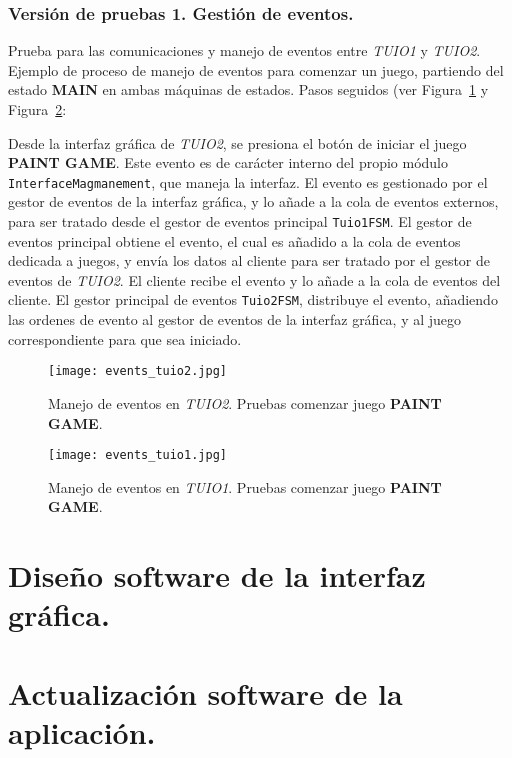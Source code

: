 \subsubsection{Versión de pruebas 1. Gestión de eventos.}

Prueba para las comunicaciones y manejo de eventos entre \emph{TUIO1} y \emph{TUIO2}. 
Ejemplo de proceso de manejo de eventos para comenzar un juego, partiendo del estado \textbf{MAIN} en ambas máquinas de estados. Pasos seguidos (ver Figura~\ref{fig:eventosTUIO2} y Figura~\ref{fig:eventosTUIO1}:

Desde la interfaz gráfica de \emph{TUIO2}, se presiona el botón de iniciar el juego \textbf{PAINT GAME}. Este evento es de carácter interno del propio módulo \texttt{InterfaceMagmanement}, que maneja la interfaz.
El evento es gestionado por el gestor de eventos de la interfaz gráfica, y lo añade a la cola de eventos externos, para ser tratado desde el gestor de eventos principal \texttt{Tuio1FSM}. 
El gestor de eventos principal obtiene el evento, el cual es añadido a la cola de eventos dedicada a juegos, y envía los datos al cliente para ser tratado por el gestor de eventos de \emph{TUIO2}.
El cliente recibe el evento y lo añade a la cola de eventos del cliente. El gestor principal de eventos \texttt{Tuio2FSM}, distribuye el evento, añadiendo las ordenes de evento al gestor de eventos de la interfaz gráfica, y al juego correspondiente para que sea iniciado.

\begin{figure}[!h]
\begin{center}
\texttt{[image: events\_tuio2.jpg]}
\caption{Manejo de eventos en \emph{TUIO2}. Pruebas comenzar juego \textbf{PAINT GAME}.}
\label{fig:eventosTUIO2}
\end{center}
\end{figure}

\begin{figure}[!h]
\begin{center}
\texttt{[image: events\_tuio1.jpg]}
\caption{Manejo de eventos en \emph{TUIO1}. Pruebas comenzar juego \textbf{PAINT GAME}.}
\label{fig:eventosTUIO1}
\end{center}
\end{figure}

\section{Diseño software de la interfaz gráfica.}



\section{Actualización software de la aplicación.}




